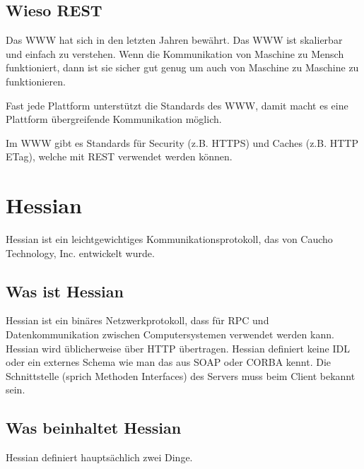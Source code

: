 \documentclass[abstracton, listof=totocnumbered,
bibliography=totocnumbered]{scrreprt}
\begin{document}
  \subsection{Wieso REST}
  
  Das \ac{WWW} hat sich in den letzten Jahren bewährt. Das \ac{WWW} ist
  skalierbar und einfach zu verstehen. Wenn die Kommunikation von Maschine zu Mensch
  funktioniert, dann ist sie sicher gut genug um auch von Maschine zu Maschine
  zu funktionieren.
  
  Fast jede Plattform unterstützt die Standards des \ac{WWW}, damit macht es
  eine Plattform übergreifende Kommunikation möglich.
  
  Im \ac{WWW} gibt es Standards für Security (z.B. \ac{HTTPS}) und Caches (z.B.
  \ac{HTTP} ETag), welche mit \ac{REST} verwendet werden können. 
  
  \section{Hessian}
  
  Hessian ist ein leichtgewichtiges Kommunikationsprotokoll, das von Caucho
  Technology, Inc. entwickelt wurde.
  
  \subsection{Was ist Hessian}
  
  Hessian ist ein binäres Netzwerkprotokoll, dass für \ac{RPC} und
  Datenkommunikation zwischen Computersystemen verwendet werden kann. Hessian wird üblicherweise
  über \ac{HTTP} übertragen. Hessian definiert keine \ac{IDL} oder ein externes
  Schema wie man das aus \ac{SOAP} oder \ac{CORBA} kennt. Die Schnittstelle (sprich
  Methoden Interfaces) des Servers muss beim Client bekannt sein.
  
  \subsection{Was beinhaltet Hessian}
  
  Hessian definiert hauptsächlich zwei Dinge.
  
\end{document}
